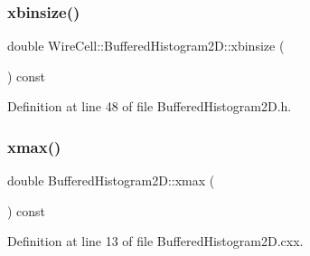 \subsubsection{\texorpdfstring{xbinsize()}{xbinsize()}}
{\footnotesize\ttfamily double Wire\+Cell\+::\+Buffered\+Histogram2\+D\+::xbinsize (\begin{DoxyParamCaption}{ }\end{DoxyParamCaption}) const\hspace{0.3cm}{\ttfamily [inline]}}



Definition at line 48 of file Buffered\+Histogram2\+D.\+h.

\mbox{\label{class_wire_cell_1_1_buffered_histogram2_d_ae993317d293e8e80541958c481e90977}} 
\subsubsection{\texorpdfstring{xmax()}{xmax()}}
{\footnotesize\ttfamily double Buffered\+Histogram2\+D\+::xmax (\begin{DoxyParamCaption}{ }\end{DoxyParamCaption}) const}



Definition at line 13 of file Buffered\+Histogram2\+D.\+cxx.

